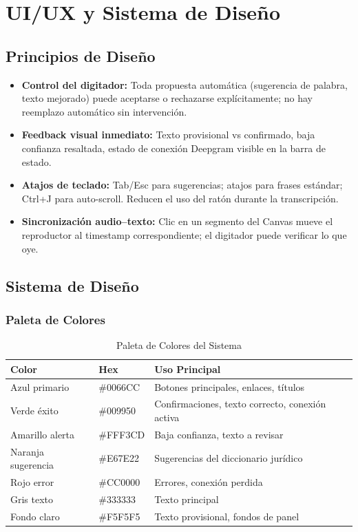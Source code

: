 \documentclass[12pt,a4paper]{report}
\begin{document}
\chapter{UI/UX y Sistema de Diseño}

\section{Principios de Diseño}

\begin{itemize}
    \item \textbf{Control del digitador:} Toda propuesta automática (sugerencia de palabra, texto mejorado) puede aceptarse o rechazarse explícitamente; no hay reemplazo automático sin intervención.
    \item \textbf{Feedback visual inmediato:} Texto provisional vs confirmado, baja confianza resaltada, estado de conexión Deepgram visible en la barra de estado.
    \item \textbf{Atajos de teclado:} Tab/Esc para sugerencias; atajos para frases estándar; Ctrl+J para auto-scroll. Reducen el uso del ratón durante la transcripción.
    \item \textbf{Sincronización audio--texto:} Clic en un segmento del Canvas mueve el reproductor al timestamp correspondiente; el digitador puede verificar lo que oye.
\end{itemize}

\section{Sistema de Diseño}

\subsection{Paleta de Colores}

\begin{table}[H]
\centering
\small
\begin{tabular}{|p{2.8cm}|p{2.2cm}|p{7cm}|}
\hline
\rowcolor{primaryblue!20}
\textbf{Color} & \textbf{Hex} & \textbf{Uso Principal} \\
\hline
Azul primario & \#0066CC & Botones principales, enlaces, títulos \\
\hline
Verde éxito & \#009950 & Confirmaciones, texto correcto, conexión activa \\
\hline
Amarillo alerta & \#FFF3CD & Baja confianza, texto a revisar \\
\hline
Naranja sugerencia & \#E67E22 & Sugerencias del diccionario jurídico \\
\hline
Rojo error & \#CC0000 & Errores, conexión perdida \\
\hline
Gris texto & \#333333 & Texto principal \\
\hline
Fondo claro & \#F5F5F5 & Texto provisional, fondos de panel \\
\hline
\end{tabular}
\caption{Paleta de Colores del Sistema}
\end{table}
\end{document}
